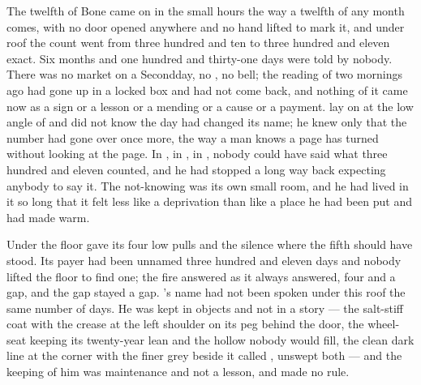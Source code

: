 
The twelfth of Bone came on in the small hours the way a twelfth of any month comes, with no door opened anywhere and no hand lifted to mark it, and under  roof the count went from three hundred and ten to three hundred and eleven exact. Six months and one hundred and thirty-one days were told by nobody. There was no market on a Secondday, no , no bell; the reading of two mornings ago had gone up  in a locked box and had not come back, and nothing of it came now as a sign or a lesson or a mending or a cause or a payment.  lay on  at the low angle of  and did not know the day had changed its name; he knew only that the number had gone over once more, the way a man knows a page has turned without looking at the page. In , in , in , nobody could have said what three hundred and eleven counted, and he had stopped a long way back expecting anybody to say it. The not-knowing was its own small room, and he had lived in it so long that it felt less like a deprivation than like a place he had been put and had made warm.

Under the floor  gave its four low pulls and the silence where the fifth should have stood. Its payer had been unnamed three hundred and eleven days and nobody lifted the floor to find one; the fire answered as it always answered, four and a gap, and the gap stayed a gap. 's name had not been spoken under this roof the same number of days. He was kept in objects and not in a story --- the salt-stiff coat with the crease at the left shoulder on its peg behind the door, the wheel-seat keeping its twenty-year lean and the hollow nobody would fill, the clean dark line at the corner with the finer grey beside it called , unswept both --- and the keeping of him was maintenance and not a lesson, and made no rule.

